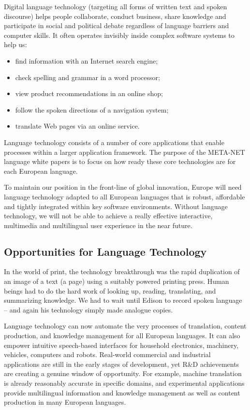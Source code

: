 \begin{multicols}{2}
    Digital language technology (targeting all forms of written text and spoken discourse) helps people collaborate, conduct business, share knowledge and participate in social and political debate regardless of language barriers and computer skills. It often operates invisibly inside complex software systems to help us:
    \begin{itemize}
      \item find information with an Internet search engine;
      \item check spelling and grammar in a word processor;
      \item view product recommendations in an online shop;
      \item follow the spoken directions of a navigation system;
      \item translate Web pages via an online service.
    \end{itemize}
    Language technology consists of a number of core applications that enable processes within a larger application framework. The purpose of the META-NET language white papers is to focus on how ready these core technologies are for each European language. 


    To maintain our position in the front-line of global innovation, Europe will need language technology adapted to all European languages that is robust, affordable and tightly integrated within key software environments. Without language technology, we will not be able to achieve a really effective interactive, multimedia and multilingual user experience in the near future.

\subsection{Opportunities for Language Technology}


    In the world of print, the technology breakthrough was the rapid duplication of an image of a text (a page) using a suitably powered printing press. Human beings had to do the hard work of looking up, reading, translating, and summarizing knowledge. We had to wait until Edison to record spoken language -- and again his technology simply made analogue copies.

    Language technology can now automate the very processes of translation, content production, and knowledge management for all European languages. It can also empower intuitive speech-based interfaces for household electronics, machinery, vehicles, computers and robots. Real-world commercial and industrial applications are still in the early stages of development, yet R\&D achievements are creating a genuine window of opportunity. For example, machine translation is already reasonably accurate in specific domains, and experimental applications provide multilingual information and knowledge management as well as content production in many European languages. 


\end{multicols}
